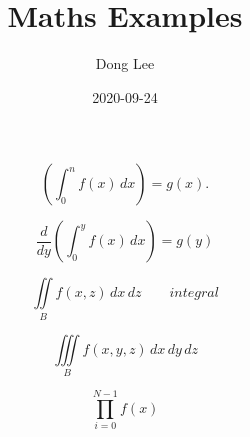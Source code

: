 \documentclass[a4paper,12pt]{article}
\begin{document}
\color{blue}
\title{Maths Examples}
\author{Dong Lee}
\date{2020-09-24}

\maketitle

\begin{center}

\color{green}
\[
\left(\int_{0}^{n}f(x)\,dx\right)=g(x).   %
\]

\color{red}
\[
\frac{d}{dy}\left(\int_{0}^{y} f(x)\,dx\right)=g(y)  %
\]


\color{blue}
\[
  \iint\limits_B f(x,z)\,dx\,dz\qquad integral  %
\]

\color{pink}
\[
 \iiint\limits_B f(x,y,z)\,dx\,dy\,dz  
\]

\color{yellow}
\[
  \prod_{i=0}^{N-1} f(x)
\]

\end{center}
\end{document}
